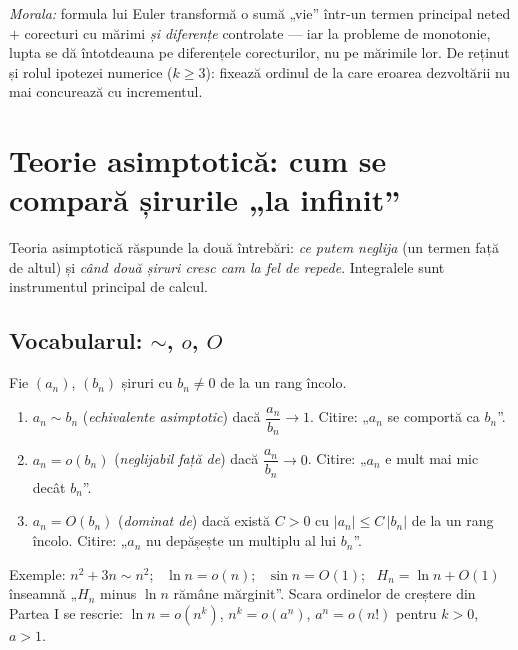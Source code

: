 \emph{Morala:} formula lui Euler transformă o sumă „vie'' într-un termen principal neted $+$ corecturi cu mărimi \emph{și diferențe} controlate --- iar la probleme de monotonie, lupta se dă întotdeauna pe diferențele corecturilor, nu pe mărimile lor. De reținut și rolul ipotezei numerice ($k\ge3$): fixează ordinul de la care eroarea dezvoltării nu mai concurează cu incrementul.

\section{Teorie asimptotică: cum se compară șirurile „la infinit''}

Teoria asimptotică răspunde la două întrebări: \emph{ce putem neglija} (un termen față de altul) și \emph{când două șiruri cresc cam la fel de repede}. Integralele sunt instrumentul principal de calcul.

\subsection{Vocabularul: $\sim$, $o$, $O$}\label{subsec:vocab-asimptotic}

\begin{definitie}
Fie $(a_n)$, $(b_n)$ șiruri cu $b_n \neq 0$ de la un rang încolo.
\begin{enumerate}[leftmargin=*, itemsep=1pt]
\item $a_n\sim b_n$ (\emph{echivalente asimptotic}) dacă $\dfrac{a_n}{b_n}\to 1$. Citire: „$a_n$ se comportă ca $b_n$''.
\item $a_n=o(b_n)$ (\emph{neglijabil față de}) dacă $\dfrac{a_n}{b_n}\to 0$. Citire: „$a_n$ e mult mai mic decât $b_n$''.
\item $a_n=O(b_n)$ (\emph{dominat de}) dacă există $C>0$ cu $|a_n|\le C\,|b_n|$ de la un rang încolo. Citire: „$a_n$ nu depășește un multiplu al lui $b_n$''.
\end{enumerate}
\end{definitie}

Exemple: $n^2+3n\sim n^2$; \ $\ln n=o(n)$; \ $\sin n=O(1)$; \ $H_n=\ln n+O(1)$ înseamnă „$H_n$ minus $\ln n$ rămâne mărginit''. Scara ordinelor de creștere din Partea I se rescrie: $\ln n=o(n^k)$, $n^k=o(a^n)$, $a^n=o(n!)$ pentru $k>0$, $a>1$.

